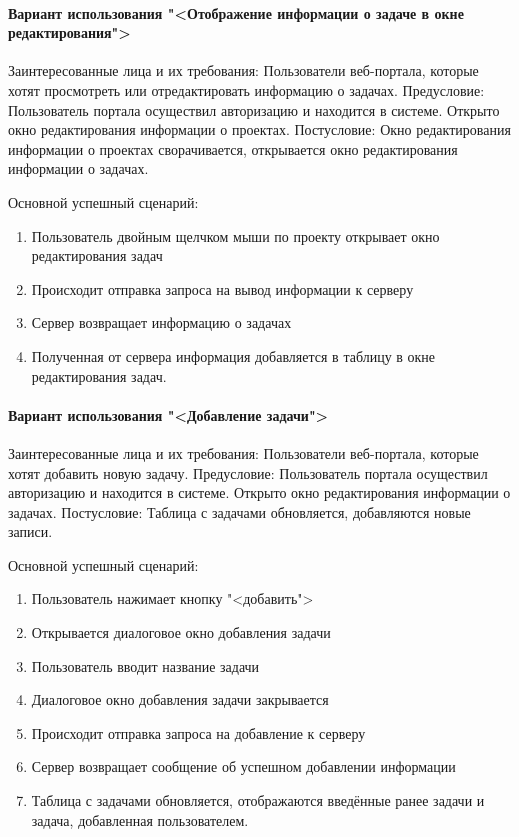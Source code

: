 \paragraph{Вариант использования "<Отображение информации о задаче в окне редактирования">}
Заинтересованные лица и их требования: Пользователи веб-портала, которые хотят просмотреть или отредактировать информацию о задачах.
Предусловие: Пользователь портала осуществил авторизацию и находится в системе. Открыто окно редактирования информации о проектах.
Постусловие: Окно редактирования информации о проектах сворачивается, открывается окно редактирования информации о задачах.

Основной успешный сценарий:
\begin{enumerate}
	\item Пользователь двойным щелчком мыши по проекту открывает окно редактирования задач
	\item Происходит отправка запроса на вывод информации к серверу 
	\item Сервер возвращает информацию о задачах
	\item Полученная от сервера информация добавляется в таблицу в окне редактирования задач.
\end{enumerate}

\paragraph{Вариант использования "<Добавление задачи">}
Заинтересованные лица и их требования: Пользователи веб-портала, которые хотят добавить новую задачу.
Предусловие: Пользователь портала осуществил авторизацию и находится в системе. Открыто окно редактирования информации о задачах.
Постусловие: Таблица с задачами обновляется, добавляются новые записи.

Основной успешный сценарий:
\begin{enumerate}
	\item Пользователь нажимает кнопку "<добавить">
	\item Открывается диалоговое окно добавления задачи
	\item Пользователь вводит название задачи
	\item Диалоговое окно добавления задачи закрывается
	\item Происходит отправка запроса на добавление к серверу 
	\item Сервер возвращает сообщение об успешном добавлении информации
	\item Таблица с задачами обновляется, отображаются введённые ранее задачи и задача, добавленная пользователем.
\end{enumerate}

